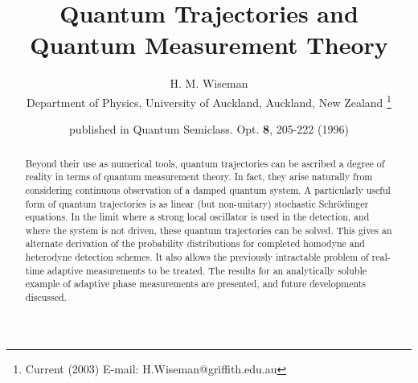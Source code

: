 \topmargin=-1.5cm
\oddsidemargin=1.5cm
\evensidemargin=1.5cm
\textwidth=15cm
\textheight=24cm
\def \baselinestretch{1.0}%


\title{Quantum Trajectories and Quantum Measurement Theory}  
\author{H. M. Wiseman  \\ Department of Physics, University of Auckland,
 Auckland, New Zealand \footnote{Current (2003) E-mail: H.Wiseman@griffith.edu.au}}
\date{published in Quantum Semiclass. Opt. {\bf 8}, 205-222 (1996)}
\maketitle


\newcommand{\beq}{\begin{equation}}
\newcommand{\eeq}{\end{equation}}
\newcommand{\bqa}{\begin{eqnarray}}
\newcommand{\eqa}{\end{eqnarray}}
\newcommand{\nn}{\nonumber}
\newcommand{\dg}{^\dagger}
\newcommand{\smallfrac}[2]{\mbox{$\frac{#1}{#2}$}}
\newcommand{\ket}[1]{| {#1} \rangle}
\newcommand{\bra}[1]{\langle {#1} |}
\newcommand{\sch}{Schr\"odinger }
\newcommand{\schs}{Schr\"odinger's }
\newcommand{\hei}{Heisenberg }
\newcommand{\heis}{Heisenberg's }
\newcommand{\half}{\smallfrac{1}{2}}
\newcommand{\bl}{{\bigl(}}
\newcommand{\br}{{\bigr)}}
\newcommand{\ito}{It\^o }
\newcommand{\str}{Stratonovich }
\newcommand{\bfi}{{\bf I}_{[0,t)}}


\begin{abstract}
Beyond their use as numerical tools, quantum trajectories can be ascribed a
degree of reality in terms of quantum measurement theory. In fact, they arise
naturally from considering continuous observation of a damped quantum system. A
particularly useful form of quantum trajectories is as linear (but non-unitary)
stochastic \sch equations. In the limit where a strong local oscillator is used
in the detection, and where the system is not driven, these quantum trajectories
can be solved. This gives an alternate derivation of the probability
distributions for completed homodyne and heterodyne detection schemes. It also
allows the previously intractable problem of real-time adaptive measurements to
be treated. The results for an analytically soluble example of adaptive phase
measurements are presented, and future developments discussed.


\end{abstract}

